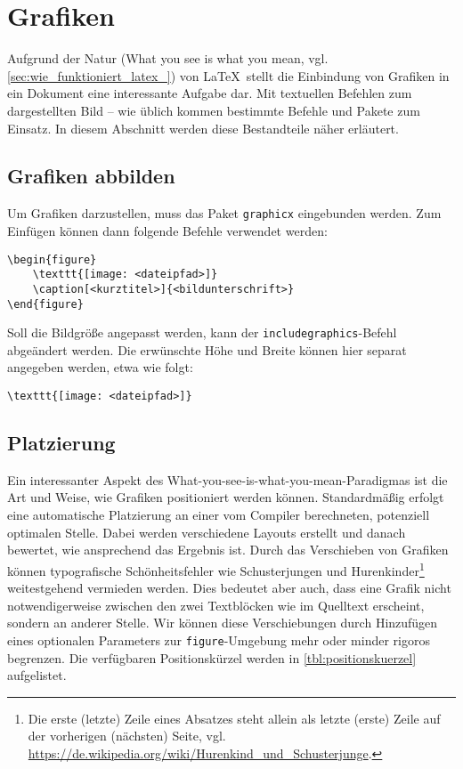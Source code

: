 \section{Grafiken}
\label{sec:grafiken_einbinden}
Aufgrund der Natur (What you see is what you mean, vgl. \cref{sec:wie_funktioniert_latex_}) von \LaTeX \  stellt die Einbindung von Grafiken in ein Dokument eine interessante Aufgabe dar. Mit textuellen Befehlen zum dargestellten Bild -- wie üblich kommen bestimmte Befehle und Pakete zum Einsatz. In diesem Abschnitt werden diese Bestandteile näher erläutert.

\subsection{Grafiken abbilden}
\label{sub:grafiken_abbilden}
Um Grafiken darzustellen, muss das Paket \texttt{graphicx} eingebunden werden. Zum Einfügen können dann folgende Befehle verwendet werden:  

\begin{verbatim}
\begin{figure}
	\texttt{[image: <dateipfad>]}
	\caption[<kurztitel>]{<bildunterschrift>}
\end{figure}
\end{verbatim}

\noindent Soll die Bildgröße angepasst werden, kann der \texttt{includegraphics}-Befehl abgeändert werden. 
Die erwünschte Höhe und Breite können hier separat angegeben werden, etwa wie folgt: 

\begin{verbatim}
\texttt{[image: <dateipfad>]}
\end{verbatim}

\subsection{Platzierung}
\label{sub:platzierung}
Ein interessanter Aspekt des What-you-see-is-what-you-mean-Paradigmas ist die Art und Weise, wie Grafiken positioniert werden können. 
Standardmäßig erfolgt eine automatische Platzierung an einer vom Compiler berechneten, potenziell optimalen Stelle.
Dabei werden verschiedene Layouts erstellt und danach bewertet, wie ansprechend das Ergebnis ist.
Durch das Verschieben von Grafiken können typografische Schönheitsfehler wie Schusterjungen und Hurenkinder\footnote{Die erste (letzte) Zeile eines Absatzes steht allein als letzte (erste) Zeile auf der vorherigen (nächsten) Seite, vgl. \url{https://de.wikipedia.org/wiki/Hurenkind_und_Schusterjunge}.} weitestgehend vermieden werden. 
Dies bedeutet aber auch, dass eine Grafik nicht notwendigerweise zwischen den zwei Textblöcken wie im Quelltext erscheint, sondern an anderer Stelle.
Wir können diese Verschiebungen durch Hinzufügen eines optionalen Parameters zur \texttt{figure}-Umgebung mehr oder minder rigoros begrenzen.
Die verfügbaren Positionskürzel werden in \cref{tbl:positionskuerzel} aufgelistet.

